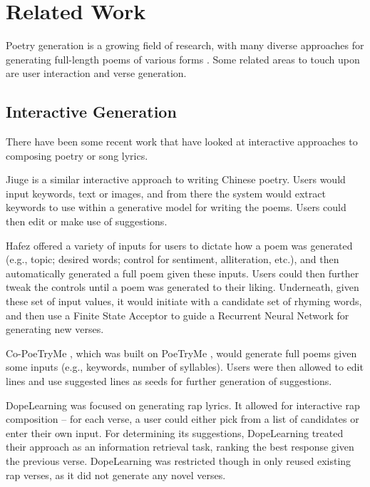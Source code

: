 \documentclass[11pt]{article}
\begin{document}

\section{Related Work}

Poetry generation is a growing field of research, with many diverse approaches for generating full-length poems of various forms \cite{oliveira2017}.
Some related areas to touch upon are user interaction and verse generation.

\subsection{Interactive Generation}

There have been some recent work that have looked at interactive approaches to composing poetry or song lyrics.

Jiuge \cite{zhipeng2019} is a similar interactive approach to writing Chinese poetry.
Users would input keywords, text or images, and from there the system would extract keywords to use within a generative model for writing the poems.
Users could then edit or make use of suggestions.

Hafez \cite{ghazvininejad2016,ghazvininejad2017} offered a variety of inputs for users to dictate how a poem was generated (e.g., topic; desired words; control for sentiment, alliteration, etc.), and then automatically generated a full poem given these inputs.
Users could then further tweak the controls until a poem was generated to their liking.
Underneath, given these set of input values, it would initiate with a candidate set of rhyming words, and then use a Finite State Acceptor to guide a Recurrent Neural Network for generating new verses.

Co-PoeTryMe \cite{oliveira17b}, which was built on PoeTryMe \cite{oliveira2012}, would generate full poems given some inputs (e.g., keywords, number of syllables).
Users were then allowed to edit lines and use suggested lines as seeds for further generation of suggestions.

DopeLearning  \cite{malmi2016} was focused on generating rap lyrics.
It allowed for interactive rap composition -- for each verse, a user could either pick from a list of candidates or enter their own input.
For determining its suggestions, DopeLearning treated their approach as an information retrieval task, ranking the best response given the previous verse.
DopeLearning was restricted though in only reused existing rap verses, as it did not generate any novel verses.
\end{document}
